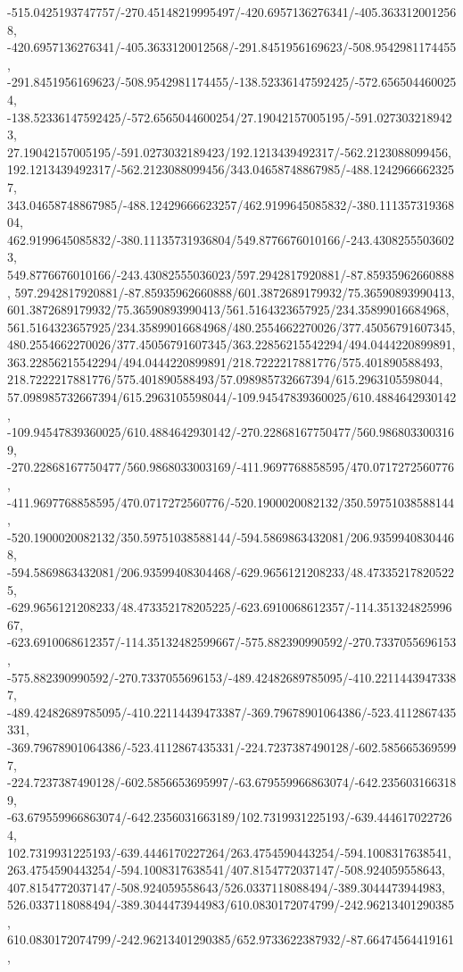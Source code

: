{    -515.0425193747757/-270.45148219995497/-420.6957136276341/-405.3633120012568,
    -420.6957136276341/-405.3633120012568/-291.8451956169623/-508.9542981174455,
    -291.8451956169623/-508.9542981174455/-138.52336147592425/-572.6565044600254,
    -138.52336147592425/-572.6565044600254/27.19042157005195/-591.0273032189423,
    27.19042157005195/-591.0273032189423/192.1213439492317/-562.2123088099456,
    192.1213439492317/-562.2123088099456/343.04658748867985/-488.12429666623257,
    343.04658748867985/-488.12429666623257/462.9199645085832/-380.11135731936804,
    462.9199645085832/-380.11135731936804/549.8776676010166/-243.43082555036023,
    549.8776676010166/-243.43082555036023/597.2942817920881/-87.85935962660888,
    597.2942817920881/-87.85935962660888/601.3872689179932/75.36590893990413,
    601.3872689179932/75.36590893990413/561.5164323657925/234.35899016684968,
    561.5164323657925/234.35899016684968/480.2554662270026/377.45056791607345,
    480.2554662270026/377.45056791607345/363.22856215542294/494.0444220899891,
    363.22856215542294/494.0444220899891/218.7222217881776/575.401890588493,
    218.7222217881776/575.401890588493/57.098985732667394/615.2963105598044,
    57.098985732667394/615.2963105598044/-109.94547839360025/610.4884642930142,
    -109.94547839360025/610.4884642930142/-270.22868167750477/560.9868033003169,
    -270.22868167750477/560.9868033003169/-411.9697768858595/470.0717272560776,
    -411.9697768858595/470.0717272560776/-520.1900020082132/350.59751038588144,
    -520.1900020082132/350.59751038588144/-594.5869863432081/206.93599408304468,
    -594.5869863432081/206.93599408304468/-629.9656121208233/48.473352178205225,
    -629.9656121208233/48.473352178205225/-623.6910068612357/-114.35132482599667,
    -623.6910068612357/-114.35132482599667/-575.882390990592/-270.7337055696153,
    -575.882390990592/-270.7337055696153/-489.42482689785095/-410.22114439473387,
    -489.42482689785095/-410.22114439473387/-369.79678901064386/-523.4112867435331,
    -369.79678901064386/-523.4112867435331/-224.7237387490128/-602.5856653695997,
    -224.7237387490128/-602.5856653695997/-63.679559966863074/-642.2356031663189,
    -63.679559966863074/-642.2356031663189/102.7319931225193/-639.4446170227264,
    102.7319931225193/-639.4446170227264/263.4754590443254/-594.1008317638541,
    263.4754590443254/-594.1008317638541/407.8154772037147/-508.924059558643,
    407.8154772037147/-508.924059558643/526.0337118088494/-389.3044473944983,
    526.0337118088494/-389.3044473944983/610.0830172074799/-242.96213401290385,
    610.0830172074799/-242.96213401290385/652.9733622387932/-87.66474564419161,
}
